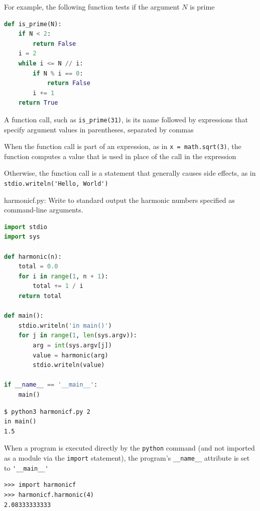 \documentclass[8pt,a4paper,compress]{beamer}
\begin{document}
\begin{frame}[fragile]
\pause

For example, the following function tests if the argument $N$ is prime

\smallskip

\begin{lstlisting}[language=Python,style=focusin]
def is_prime(N):
    if N < 2: 
        return False
    i = 2
    while i <= N // i:
        if N % i == 0:
            return False
        i += 1
    return True
\end{lstlisting}

\pause
\bigskip

A function call, such as \lstinline{is_prime(31)}, is its name followed by expressions that specify argument values in parentheses, separated by commas

\pause
\bigskip

When the function call is part of an expression, as in \lstinline{x = math.sqrt(3)}, the function computes a value that is used in place of the call in the expression

\pause
\bigskip

Otherwise, the function call is a statement that generally causes side effects, as in \lstinline{stdio.writeln('Hello, World')}
\end{frame}

\begin{frame}[fragile]
\pause

\begin{framed}
\tiny harmonicf.py:  Write to standard output the harmonic numbers specified as command-line arguments.
\end{framed}

\begin{lstlisting}[language=Python,style=focusin]
import stdio
import sys

def harmonic(n):
    total = 0.0
    for i in range(1, n + 1):
        total += 1 / i
    return total

def main():
    stdio.writeln('in main()')
    for j in range(1, len(sys.argv)):
        arg = int(sys.argv[j])
        value = harmonic(arg)
        stdio.writeln(value)

if __name__ == '__main__':
    main()
\end{lstlisting}

\pause\smallskip

\begin{lstlisting}[language={},style=focusin]
$ python3 harmonicf.py 2
in main()
1.5
\end{lstlisting}

\pause
\bigskip

When a program is executed directly by the \lstinline{python} command (and not imported as a module via the \lstinline{import} statement), the program's \lstinline{__name__} attribute is set to \lstinline{'__main__'}

\smallskip

\begin{lstlisting}[language={},style=focusin]
>>> import harmonicf
>>> harmonicf.harmonic(4)
2.08333333333
\end{lstlisting}
\end{frame}
\end{document}

